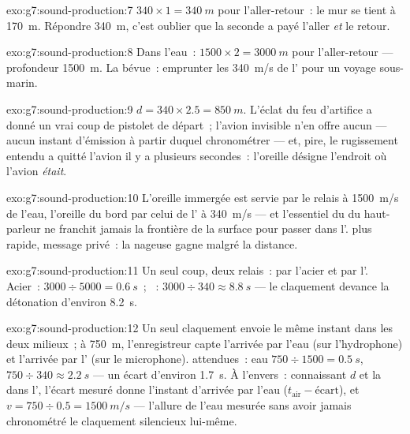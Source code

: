 \begin{solution}{exo:g7:sound-production:7}
$340 \times 1 = \qty{340}{m}$ pour l'aller-retour~: le mur se tient à
\qty{170}{m}. Répondre \qty{340}{m}, c'est oublier que la seconde a
payé l'aller \emph{et} le retour.
\end{solution}

\begin{solution}{exo:g7:sound-production:8}
Dans l'eau~: $1500 \times 2 = \qty{3000}{m}$ pour l'aller-retour ---
profondeur \qty{1500}{m}. La bévue~: emprunter les \qty{340}{m/s} de
l' pour un voyage sous-marin.
\end{solution}

\begin{solution}{exo:g7:sound-production:9}
$d = 340 \times 2.5 = \qty{850}{m}$. L'éclat du feu d'artifice a
donné un vrai coup de pistolet de départ~; l'avion invisible n'en
offre aucun --- aucun instant d'émission à partir duquel
chronométrer --- et, pire, le rugissement entendu a quitté l'avion il
y a plusieurs secondes~: l'oreille désigne l'endroit où l'avion
\emph{était}.
\end{solution}

\begin{solution}{exo:g7:sound-production:10}
L'oreille immergée est servie par le relais à \qty{1500}{m/s} de
l'eau, l'oreille du bord par celui de l' à \qty{340}{m/s} --- et
l'essentiel du  du haut-parleur ne franchit jamais la frontière de
la surface pour passer dans l'.  plus rapide, message
privé~: la nageuse gagne malgré la distance.
\end{solution}

\begin{solution}{exo:g7:sound-production:11}
Un seul coup, deux relais~: par l'acier et par l'. Acier~:
$3000 \div 5000 = \qty{0.6}{s}$~; ~:
$3000 \div 340 \approx \qty{8.8}{s}$ --- le claquement devance la
détonation d'environ \qty{8.2}{s}.
\end{solution}

\begin{solution}{exo:g7:sound-production:12}
Un seul claquement envoie le même instant dans les deux milieux~; à
\qty{750}{m}, l'enregistreur capte l'arrivée par l'eau (sur
l'hydrophone) et l'arrivée par l' (sur le microphone). 
attendues~: eau $750 \div 1500 = \qty{0.5}{s}$, 
$750 \div 340 \approx \qty{2.2}{s}$ --- un écart d'environ
\qty{1.7}{s}. À l'envers~: connaissant $d$ et la  dans l',
l'écart mesuré donne l'instant d'arrivée par l'eau
($t_{\text{air}} - \text{écart}$), et
$v = 750 \div 0.5 = \qty{1500}{m/s}$ --- l'allure de l'eau mesurée
sans avoir jamais chronométré le claquement silencieux lui-même.
\end{solution}

